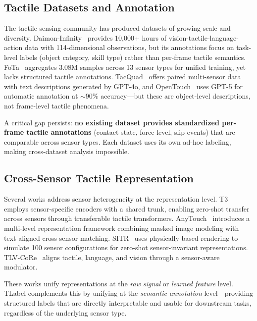 \documentclass[conference]{IEEEtran}
\begin{document}
\subsection{Tactile Datasets and Annotation}

The tactile sensing community has produced datasets of growing scale and diversity. Daimon-Infinity~\cite{daimon2026} provides 10,000+ hours of vision-tactile-language-action data with 114-dimensional observations, but its annotations focus on task-level labels (object category, skill type) rather than per-frame tactile semantics. FoTa~\cite{fota2024} aggregates 3.08M samples across 13 sensor types for unified training, yet lacks structured tactile annotations. TacQuad~\cite{tacquad2025} offers paired multi-sensor data with text descriptions generated by GPT-4o, and OpenTouch~\cite{opentouch2025} uses GPT-5 for automatic annotation at $\sim$90\% accuracy---but these are object-level descriptions, not frame-level tactile phenomena.

A critical gap persists: \textbf{no existing dataset provides standardized per-frame tactile annotations} (contact state, force level, slip events) that are comparable across sensor types. Each dataset uses its own ad-hoc labeling, making cross-dataset analysis impossible.

\subsection{Cross-Sensor Tactile Representation}

Several works address sensor heterogeneity at the representation level. T3~\cite{zhao2024t3} employs sensor-specific encoders with a shared trunk, enabling zero-shot transfer across sensors through transferable tactile transformers. AnyTouch~\cite{feng2025anytouch} introduces a multi-level representation framework combining masked image modeling with text-aligned cross-sensor matching. SITR~\cite{sitr2025} uses physically-based rendering to simulate 100 sensor configurations for zero-shot sensor-invariant representations. TLV-CoRe~\cite{tlvcore2025} aligns tactile, language, and vision through a sensor-aware modulator.

These works unify representations at the \emph{raw signal} or \emph{learned feature} level. TLabel complements this by unifying at the \emph{semantic annotation} level---providing structured labels that are directly interpretable and usable for downstream tasks, regardless of the underlying sensor type.
\end{document}
